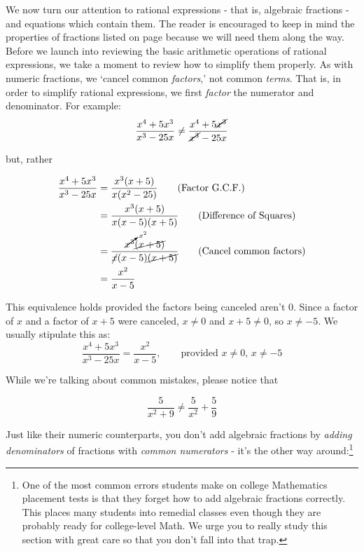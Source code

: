 

\setcounter{footnote}{0}

\label{AppRatExpEqus}

We now turn our attention to rational expressions - that is, algebraic fractions - and equations which contain them.  The reader is encouraged to keep in mind the properties of fractions listed on page \pageref{fractionarithmetic} because we will need them along the way.  Before we launch into reviewing the basic arithmetic operations of rational expressions, we take a moment to review how to simplify them properly.  As with numeric fractions, we `cancel common \textit{factors},' not common \textit{terms}.  That is, in order to simplify rational expressions, we first \textit{factor} the numerator and denominator.  For example:  \[ \dfrac{x^4 + 5x^3}{x^3 - 25x} \neq \dfrac{x^4 + 5\cancel{x^3}}{\cancel{x^3} - 25x} \]

but, rather

\begin{align*}
\dfrac{x^4 + 5x^3}{x^3 - 25x} & = \dfrac{x^3(x + 5)}{x(x^2-25)} \tag{Factor G.C.F.} \\ 
& = \dfrac{x^3(x + 5)}{x(x-5)(x+5)} \tag{Difference of Squares} \\ 
& = \dfrac{\cancelto{x^2}{x^3}\cancel{(x + 5)}}{\cancel{x}(x-5)\cancel{(x+5)}} \tag{Cancel common factors}\\
& = \dfrac{x^2}{x-5} \\
\end{align*}

This equivalence holds provided the factors being canceled aren't $0$. Since a factor of $x$ and a factor of $x+5$ were canceled, $x \neq 0$ and $x+5 \neq 0$, so $x \neq -5$.   We usually stipulate this as: \[ \dfrac{x^4 + 5x^3}{x^3 - 25x}  = \dfrac{x^2}{x-5}, \qquad \text{provided $x \neq 0$, $x \neq -5$} \]

While we're talking about common mistakes, please notice that 

\[ \dfrac{5}{x^2+9} \neq \dfrac{5}{x^2} + \dfrac{5}{9} \] 

Just like their numeric counterparts, you don't add algebraic fractions by \textit{adding denominators} of fractions with \textit{common numerators} - it's the other way around:\footnote{One of the most common errors students make on college Mathematics placement tests is that they forget how to add algebraic fractions correctly.  This places many students into remedial classes even though they are probably ready for college-level Math.  We urge you to really study this section with great care so that you don't fall into that trap.} 

